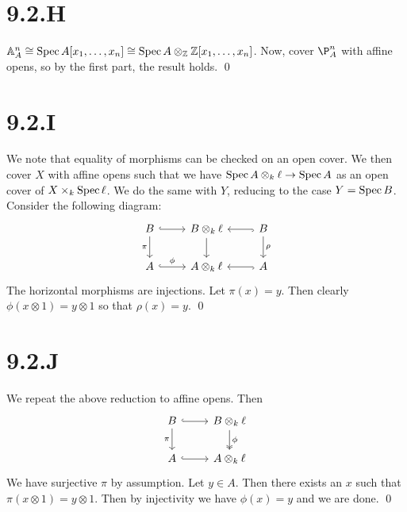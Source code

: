 \documentclass{article}
\begin{document}
\section{9.2.H}
$\mathbb{A}^n_A \cong \operatorname{Spec} A[x_1, \dots, x_n] \cong \operatorname{Spec} A
    \otimes_{\mathbb{Z}} \mathbb{Z}[x_1, \dots, x_n]$. Now, cover $\P^n_A$ with affine opens,
so by the first part, the result holds. \qed

\section{9.2.I}
We note that equality of morphisms can be checked on an open cover. We then
cover $X$ with affine opens such that we have
$\operatorname{Spec} A \otimes_k \ell \to \operatorname{Spec} A$ as an open cover of $X \times_k \operatorname{Spec} \ell$. We do the
same with $Y$, reducing to the case
$Y=\operatorname{Spec} B$. Consider the following diagram: \[\begin{tikzcd}
        B                & {B\otimes_k\ell}           & B \\
        A                &
        {A\otimes_k\ell} & A \arrow[from=1-2, to=2-2]
        \arrow[hook, from=1-1, to=1-2] \arrow["\phi", hook, from=2-1, to=2-2] \arrow["\pi"', from=1-1, to=2-1]
        \arrow["\rho", from=1-3, to=2-3] \arrow[hook, from=2-3, to=2-2] \arrow[hook, from=1-3, to=1-2]
    \end{tikzcd}\]
The horizontal morphisms are injections. Let $\pi(x)=y$. Then
clearly $\phi(x\otimes 1)=y\otimes 1$ so that $\rho(x)=y$. \qed

\section{9.2.J}
We repeat the above reduction to affine opens. Then  \[\begin{tikzcd}
        B & {B\otimes_k\ell} \\
        A &
        {A\otimes_k\ell} \arrow["\phi", two heads, from=1-2, to=2-2]
        \arrow[hook, from=1-1, to=1-2] \arrow[hook, from=2-1, to=2-2] \arrow["\pi"', from=1-1, to=2-1]
    \end{tikzcd}\] We
have surjective $\pi$ by assumption. Let
$y \in A$. Then there exists an $x$ such that
$\pi(x\otimes 1)=y\otimes 1$. Then by injectivity we have $\phi(x)=y$
and we are done. \qed
\end{document}
